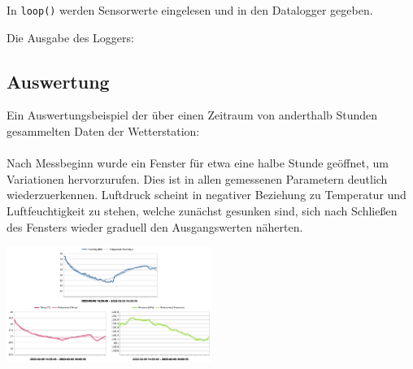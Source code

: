 \documentclass[ngerman]{schoolPres}
\begin{document}
  \begin{frame}[fragile]
    In \texttt{loop()} werden Sensorwerte eingelesen und in den Datalogger gegeben.\\
    
  \end{frame}

  \begin{frame}[fragile]
    Die Ausgabe des Loggers:\\
    
  \end{frame}

  \subsection{Auswertung}
  \begin{frame}
    Ein Auswertungsbeispiel der über einen Zeitraum von anderthalb Stunden gesammelten Daten der Wetterstation:\\~\\

    Nach Messbeginn wurde ein Fenster für etwa eine halbe Stunde geöffnet, um Variationen hervorzurufen.
    Dies ist in allen gemessenen Parametern deutlich wiederzuerkennen.
    Luftdruck scheint in negativer Beziehung zu Temperatur und Luftfeuchtigkeit zu stehen, welche zunächst gesunken sind, sich nach Schließen des Fensters wieder graduell den Ausgangswerten näherten.

    \begin{center}
      \includegraphics[width=0.5\textwidth]{media/data.pdf}
    \end{center}

  \end{frame}
\end{document}

